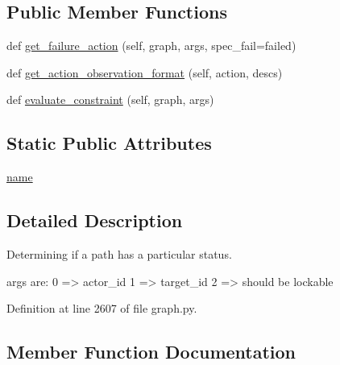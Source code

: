 \subsection*{Public Member Functions}
\begin{DoxyCompactItemize}
\item 
def \hyperlink{classlight__chats_1_1graph_1_1LockableConstraint_a54fa507fa6b123fa5e818b48ab5bf207}{get\+\_\+failure\+\_\+action} (self, graph, args, spec\+\_\+fail=\textquotesingle{}failed\textquotesingle{})
\item 
def \hyperlink{classlight__chats_1_1graph_1_1LockableConstraint_abab472da88c21dc3ea5f7ee874bad9d4}{get\+\_\+action\+\_\+observation\+\_\+format} (self, action, descs)
\item 
def \hyperlink{classlight__chats_1_1graph_1_1LockableConstraint_ab3c3fccadea265252eb3451fae2969e4}{evaluate\+\_\+constraint} (self, graph, args)
\end{DoxyCompactItemize}
\subsection*{Static Public Attributes}
\begin{DoxyCompactItemize}
\item 
\hyperlink{classlight__chats_1_1graph_1_1LockableConstraint_a9de4ab5a0b0434496da7971c7c015054}{name}
\end{DoxyCompactItemize}


\subsection{Detailed Description}
\begin{DoxyVerb}Determining if a path has a particular status.

args are:     0 => actor_id     1 => target_id     2 => should be lockable
\end{DoxyVerb}
 

Definition at line 2607 of file graph.\+py.



\subsection{Member Function Documentation}
\mbox{\label{classlight__chats_1_1graph_1_1LockableConstraint_ab3c3fccadea265252eb3451fae2969e4}} 
